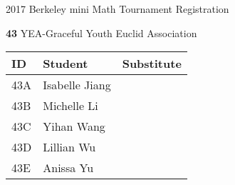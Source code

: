 \documentclass[12pt]{amsart}
\begin{document}
\newpage



\renewcommand{\TeamID}{43}
\renewcommand{\TeamName}{YEA-Graceful}
\renewcommand{\SchoolName}{Youth Euclid Association}
\renewcommand{\IDA}{43A}
\renewcommand{\IDB}{43B}
\renewcommand{\IDC}{43C}
\renewcommand{\IDD}{43D}
\renewcommand{\IDE}{43E}
\renewcommand{\StudentA}{Isabelle Jiang}
\renewcommand{\StudentB}{Michelle Li}
\renewcommand{\StudentC}{Yihan Wang}
\renewcommand{\StudentD}{Lillian Wu}
\renewcommand{\StudentE}{Anissa Yu}

\begin{center}
{\sc \Large 2017 Berkeley mini Math Tournament Registration}

\bigskip
\bigskip

{\bf \Large  \TeamID} \hfill {\large \TeamName} \hfill {\large \SchoolName}

\bigskip
\bigskip

\begin{tabular}{| p{} | p{} | p{} |}
\hline
\bf ID         & \bf Student             & \bf Substitute             \\ \hline
\IDA           & \StudentA               &                            \\ \hline
\IDB           & \StudentB               &                            \\ \hline
\IDC           & \StudentC               &                            \\ \hline
\IDD           & \StudentD               &                            \\ \hline
\IDE           & \StudentE               &                            \\ \hline
\end{tabular} 
\end{center}
\bigskip
\bigskip

\newpage



\renewcommand{\TeamID}{44}
\renewcommand{\TeamName}{YEA-HPMS}
\renewcommand{\SchoolName}{Youth Euclid Association}
\renewcommand{\IDA}{44A}
\renewcommand{\IDB}{44B}
\renewcommand{\IDC}{44C}
\renewcommand{\IDD}{44D}
\renewcommand{\IDE}{44E}
\renewcommand{\StudentA}{Morris Wu}
\renewcommand{\StudentB}{Gavin Wang}
\renewcommand{\StudentC}{Ethan Han}
\renewcommand{\StudentD}{Leo Zhang}
\renewcommand{\StudentE}{Eric Chen}
\end{document}
